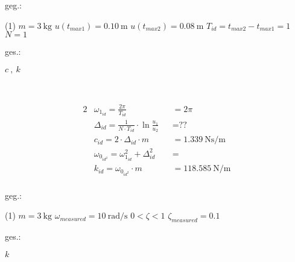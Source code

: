 


    \begin{minipage}[t]{.49\linewidth}
        geg.:
        \begin{tasks}(1)
           \task[] $m = \SI{3}{\kilo\gram}$
           \task[] $u(t_{max1}) = \SI{0.10}{\meter}$
           \task[] $u(t_{max2}) = \SI{0.08}{\meter}$
           \task[] $T_{id} = t_{max2}-t_{max1} = 1$
           \task[] $N = 1$
        \end{tasks}
        \end{minipage}
        \begin{minipage}[t]{.49\linewidth}
        ges.:
        \begin{tasks}
            \task $c ~,~ k$
        \end{tasks}
    \end{minipage}\\
    \vspace{1cm}


    \begin{solution}
        \begin{alignat*}{2}
            &\omega_{1_{id}} = \frac{2 \pi}{T_{id}} &&= 2 \pi\\
            &\Delta_{id} = \frac{1}{N \cdot T_{id} } \cdot \ln{\frac{u_1}{u_2}} &&= \text{??}\\
            &c_{id} = 2 \cdot \Delta_{id} \cdot m &&= \SI{1.339}{\newton \second \per \meter}\\
            &\omega_{0_{id^2}} = \omega_{1_{id}}^2 + \Delta_{id}^2 &&= \\
            &k_{id} = \omega_{0_{id^2}} \cdot m &&= \SI{118.585}{\newton \per \meter}\\
        \end{alignat*}
    \end{solution}



\begin{minipage}[t]{.49\linewidth}
    geg.:
    \begin{tasks}(1)
        \task[] $m = \SI{3}{\kilo\gram}$
        \task[] $\omega_{measured} = \SI{10}{\radian\per\second}$
        \task[] $0 < \zeta < 1$
        \task[] $\zeta_{measured} = 0.1$
    \end{tasks}
    \end{minipage}
    \begin{minipage}[t]{.49\linewidth}
    ges.:
    \begin{tasks}
        \task $k$
    \end{tasks}
\end{minipage}\\
\vspace{1cm}

